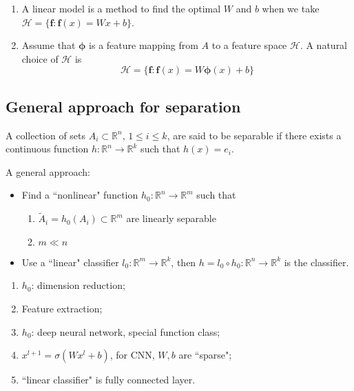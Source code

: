 \begin{enumerate}
	\item A linear model  is a method to find the optimal $W$ and $b$ when we take $\mathscr{H} = \{\bm{f}: \bm{f}(x) = Wx+b\}$.\\
	
	\item Assume that $\bm{\phi}$ is a feature mapping from $A$ to a feature space $\mathcal{H}$. A natural choice of $\mathscr{H}$ is 
	\begin{equation}
	\mathscr{H} = \{\bm{f}: \bm{f}(x) = W\bm{\phi}(x)+b\}
	\end{equation}
\end{enumerate}


\subsection{General approach for separation }
A collection of sets $A_i\subset \mathbb{R}^n$, $1\le i\le k$, are said to be separable if there exists a continuous function $h:\mathbb{R}^n\to\mathbb{R}^k$ such that $h(x)=e_i$.

A general approach:
\begin{itemize}
	\item Find a ``nonlinear" function $h_0:\mathbb{R}^n\to\mathbb{R}^m$ such that
\begin{enumerate}
	\item $\tilde{A}_i=h_0(A_i)\subset\mathbb{R}^m$ are linearly separable
	\item $m\ll n$
\end{enumerate}
\item Use a ``linear" classifier $l_0:\mathbb{R}^m\to\mathbb{R}^k$, then $h=l_0\circ h_0:\mathbb{R}^n\to\mathbb{R}^k$ is the classifier.
\end{itemize}

\begin{remark}
	\begin{enumerate}
		\item $h_0$: dimension reduction;
		\item Feature extraction;
		\item $h_0$: deep neural network, special function class;
		\item $x^{l+1}=\sigma(Wx^l+b)$, for CNN, $W,b$ are ``sparse";
		\item ``linear classifier" is fully connected layer.
	\end{enumerate}
	\end{remark}

